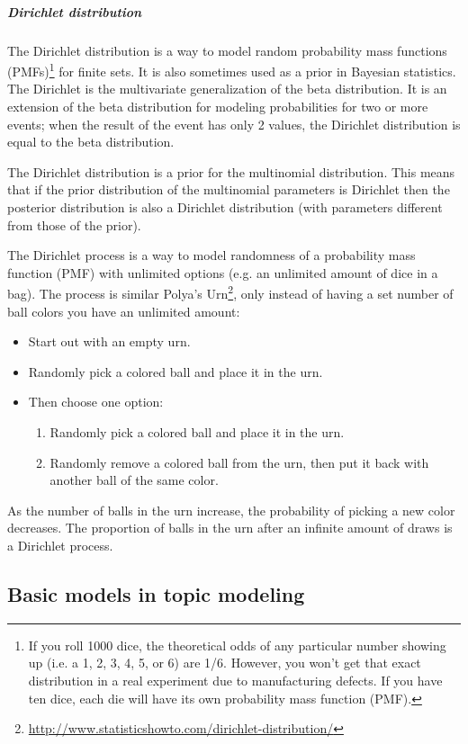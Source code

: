 \documentclass[12pt]{report}
\begin{document}
\subparagraph{Dirichlet distribution}

The Dirichlet distribution is a way to model random probability mass functions
(PMFs)\footnote{If you roll 1000 dice, the theoretical odds of any particular
number showing up (i.e. a 1, 2, 3, 4, 5, or 6) are 1/6. However, you won't get
that exact distribution in a real experiment due to manufacturing defects. If
you have ten dice, each die will have its own probability mass function (PMF).}
for finite sets. It is also sometimes used as a prior in Bayesian statistics.
The Dirichlet is the multivariate generalization of the beta distribution. It
is an extension of the beta distribution for modeling probabilities for two or
more events; when the result of the event has only 2 values, the Dirichlet
distribution is equal to the beta distribution.

The Dirichlet distribution is a prior for the multinomial distribution. This
means that if the prior distribution of the multinomial parameters is Dirichlet
then the posterior distribution is also a Dirichlet distribution (with
parameters different from those of the prior).

The Dirichlet process is a way to model randomness of a probability mass
function (PMF) with unlimited options (e.g. an unlimited amount of dice in a
bag). The process is similar Polya's Urn\footnote{\url{http://www.statisticshowto.com/dirichlet-distribution/}}, only instead of having a set number
of ball colors you have an unlimited amount:

\begin{itemize}
\item Start out with an empty urn.
\item Randomly pick a colored ball and place it in the urn.
\item Then choose one option:
\begin{enumerate}
\item Randomly pick a colored ball and place it in the urn.
\item Randomly remove a colored ball from the urn, then put it back with another 
ball of the same color.
\end{enumerate}
\end{itemize}
 
As the number of balls in the urn increase, the probability of picking a new
color decreases. The proportion of balls in the urn after an infinite amount of
draws is a Dirichlet process.


\subsection{Basic models in topic modeling}
\end{document}

